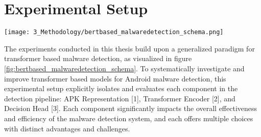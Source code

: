 \begin{table}[t]
    \centering
    \caption{\label{tab:detectbert-results}
        DetetBERT Results Across Datasets and Splits. 
        Results show accuracy, precision, recall, and F1 scores 
        for both random and time based splits.}
\end{table}


\section{Experimental Setup}
\label{sec:experimental_setup}

\begin{figure*}[b]
    \centering
    \begin{minipage}{1.5\textwidth}
        \centering
        \texttt{[image: 3\_Methodology/bertbased\_malwaredetection\_schema.png]}
        \captionsetup{width=\textwidth}
        \caption{\label{fig:bertbased_malwaredetection_schema}
        Generalized BERT based approach for malware detection. 
        This figure illustrates a blueprint for utilizing BERT models in APK based 
        malware detection. 
        The process consists of three main stages: 
        extracting an APK representation [1], 
        encoding it using a Transformer based model (BERT) [2], 
        and applying a decision head to generate the final prediction [3]. 
        The numbered elements indicate open design choices within this blueprint.
        }
    \end{minipage}
\end{figure*}


The experiments conducted in this thesis build upon a generalized paradigm for transformer based malware detection, 
as visualized in figure \ref{fig:bertbased_malwaredetection_schema}. 
To systematically investigate and improve transformer based models for Android malware detection, 
this experimental setup explicitly isolates and evaluates each component in the detection pipeline: 
APK Representation [1], Transformer Encoder [2], and Decision Head [3]. 
Each component significantly impacts the overall effectiveness and efficiency of the malware detection system, 
and each offers multiple choices with distinct advantages and challenges.

